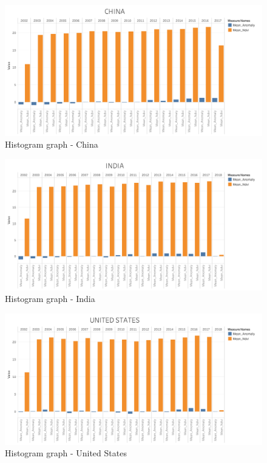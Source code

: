 \begin{itemize}
    \begin{figure}[H]
            \centering
            \includegraphics[width=1.0\linewidth]{figures/ch5/Histograms/CHINA_histogram.png}
            \caption{Histogram graph - China}\label{Fig:CHINA_histogram}
    \end{figure}
    
    
    \begin{figure}[H]
            \centering
            \includegraphics[width=1.0\linewidth]{figures/ch5/Histograms/INDIA_histogram.png}
            \caption{Histogram graph - India}\label{Fig:INDIA_histogram}
    \end{figure}
    
   
     \begin{figure}[H]
            \centering
            \includegraphics[width=1.0\linewidth]{figures/ch5/Histograms/US_histogram.png}
            \caption{\label{fig:US_histogram} Histogram graph - United States}
    \end{figure}


\end{itemize}

